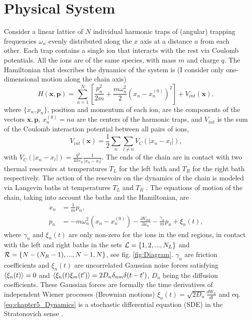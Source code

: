\section{Physical System\label{sec:chapter5_PhysicalSystem}}
%
%
%
%
Consider a linear lattice of $N$ individual harmonic traps of (angular) trapping frequencies  $\omega_n$ evenly distributed along the $x$ axis at a distance $a$ from each other. Each trap contains a single ion that interacts with the rest via Coulomb potentials. All the ions are of the same species, with mass $m$ and charge $q$. The Hamiltonian that describes the dynamics of the system is (I consider only one-dimensional motion along the chain axis)
%
\begin{equation}
    H(\bm{x},\bm{p}) = \sum_{n=1}^N \left[\frac{p_n^2}{2m}  + \frac{m\omega_n^2}{2} (x_n - x_n^{(0)})^2\right] + V_{int}(\bm{x}),
    \label{eq:chapter5_ChainHamiltonian}
\end{equation}
%
where $\{x_n,p_n\}$, position and momentum of each ion, are the components of  the vectors
$\bm{x},\bm{p}$, $x_n^{(0)} = n  a$ are the centers of the harmonic traps, and $V_{int}$ is the sum of the Coulomb interaction potential between all  pairs of ions,
%
\begin{equation}
    V_{int}(\bm{x}) = \frac{1}{2}\sum_n \sum_{l\neq n} V_{C}(\left|x_n-x_l\right|),
    \label{eq:chapter5_InteractionHamiltonian}
\end{equation}
%
with $V_{C}(\left|x_n-x_l\right|) = \frac{q^2}{4\pi\varepsilon_0}\frac{1}{\left|x_n-x_l\right|}$. The ends of the chain are in contact with two thermal reservoirs at temperatures $T_L$ for the left bath and $T_R$ for the right bath respectively. The action of the resevoirs on the dynamics of the chain is modeled via Langevin baths at temperatures $T_L$ and $T_R$ \cite{Lepri2003,Dhar2018}. The equations of motion of the chain, taking into account the baths and the Hamiltonian, are
%
\begin{align}
  \dot{x}_n &= \frac{1}{m}p_n,\nonumber \\
  \dot{p}_n &= - m\omega_n^2 (x_n-x_n^{(0)}) - \frac{\partial V_{int}}{\partial x_n} - \frac{\gamma_n}{m}p_n + \xi_n(t),
  \label{eq:chapter5_Dynamics}
\end{align}
%
where $\gamma_n$ and $\xi_n(t)$ are only non-zero for the ions in the end regions, in contact with the left and right baths in the sets ${\cal L} = \left\{1,2,...,N_L\right\}$ and \linebreak ${\cal R} = \left\{N-(N_R-1),...,N-1,N\right\}$,  see fig. \ref{fig:Diagram}. $\gamma_n$ are friction coefficients and $\xi_n(t)$ are uncorrelated Gaussian noise forces satisfying $\expval{ \xi_n(t)} = 0$ and $\expval{ \xi_n(t)\xi_m(t') } = 2 D_n \delta_{nm}\delta(t-t')$, $D_n$ being the diffusion coefficients. These Gaussian forces are formally the time derivatives of independent Wiener processes (Brownian motions)   $\xi_n(t) = \sqrt{2D_n}\frac{dW_n}{dt}$ \cite{Toral2014,Ruiz2014} and eq. \eqref{eq:chapter5_Dynamics} is a stochastic differential equation (SDE) in the Stratonovich sense \cite{Toral2014}.

